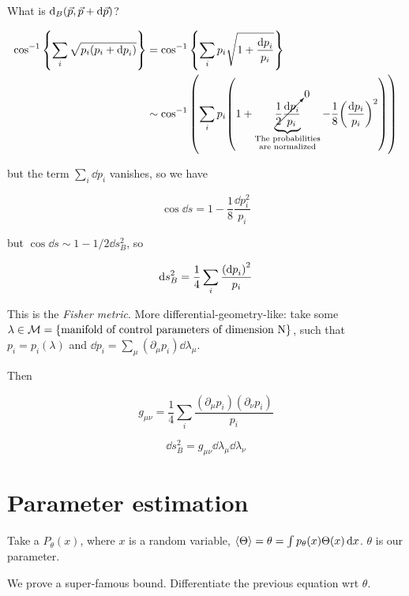 What is \( \dd _{B} \qty(\vec{p} , \vec{p} + \dd{\vec{p}}) \)?

\begin{align}
  \cos ^{-1} \qty{\sum_i \sqrt{p_i(p_i + \dd{p}_i)}}
  &= \cos ^{-1} \qty{\sum_i p_i \sqrt{1 + \frac{\dd{p}_i }{p_i}}}  \\
  &\sim \cos ^{-1} \qty(\sum_i p_i \qty(1 + \underbrace{\cancelto{0}{\frac{1}{2} \frac{\dd{p}_i}{p_i}}}_{\substack{\text{The probabilities}\\ \text{are normalized}}}     - \frac{1}{8} \qty(\frac{\dd{p_i}}{p_i})^{2} ))
\end{align}

but the term \( \sum_i \dd{p}_i \) vanishes, so we have

\begin{equation}
  \cos \dd{s} = 1 - \frac{1}{8}\frac{\dd{p}_i ^{2} }{p_i}
\end{equation}

but \( \cos \dd{s} \sim 1 - 1/2 \dd{s}^{2} _{B}  \), so

\begin{equation} \label{eq:fisher-metric}
  \dd{s}^{2}_{B}  = \frac{1}{4} \sum_i  \frac{\qty(\dd{p}_i)^{2} }{p_i}
\end{equation}

This is the \emph{Fisher metric}. More differential-geometry-like: take some \( \lambda \in \mathcal{M} = \qty{\text{manifold of control parameters of dimension N}} \), such that \( p_i = p_i(\lambda) \) and  \( \dd{p}_i = \sum_\mu (\partial_\mu p_i) \dd{\lambda_\mu} \).

Then

\begin{equation}
  g _{\mu \nu} = \frac{1}{4} \sum_i \frac{(\partial_\mu p_i)(\partial_\nu p_i)}{p_i}
\end{equation}

\begin{equation}
  \dd{s}_B ^2 = g _{\mu \nu} \dd{\lambda}_\mu \dd{\lambda}_\nu
\end{equation}

\section{Parameter estimation}

Take a \(P_\theta (x)\), where \( x \) is a random variable, \( \expval{\Theta} = \theta = \int  p_\theta(x) \Theta(x) \dd{x}  \). \(\theta\) is our parameter.

We prove a super-famous bound. Differentiate the previous equation wrt \( \theta \).


